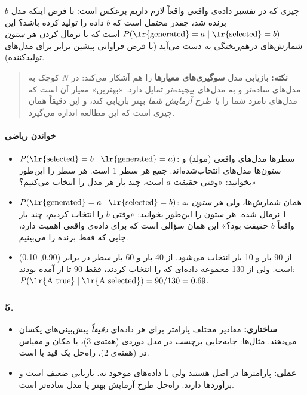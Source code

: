 چیزی که در تفسیر داده‌ی واقعی واقعاً لازم داریم برعکس است: با فرض اینکه
مدل \(b\) برنده شد، چقدر محتمل است که \(b\) داده را تولید کرده باشد؟ این
\textbf{}
\(P(\text{\lr{generated}} = a \mid \text{\lr{selected}} = b)\) است که با نرمال
کردن هر \emph{ستون} شمارش‌های درهم‌ریختگی به دست می‌آید (با فرض فراوانی
پیشین برابر برای مدل‌های تولیدکننده).

\begin{quote}
\textbf{نکته:} بازیابی مدل \textbf{سوگیری‌های معیارها} را هم آشکار می‌کند:
 در \(N\) کوچک به مدل‌های ساده‌تر و  به مدل‌های پیچیده‌تر
تمایل دارد. «بهترین» معیار آن است که مدل‌های نامزد شما را \emph{با طرح
آزمایش شما} بهتر بازیابی کند، و این دقیقاً همان چیزی است که این مطالعه
اندازه می‌گیرد.
\end{quote}

\paragraph{خواندن ریاضی}

\begin{itemize}
\tightlist
\item
  \textbf{}
  \(P(\text{\lr{selected}} = b \mid \text{\lr{generated}} = a)\): سطرها مدل‌های
  واقعی (مولد) و ستون‌ها مدل‌های انتخاب‌شده‌اند. جمع هر سطر 1 است. هر سطر را
  این‌طور بخوانید: «وقتی حقیقت \(a\) است، چند بار هر مدل را انتخاب
  می‌کنیم؟»
\item
  \textbf{}
  \(P(\text{\lr{generated}} = a \mid \text{\lr{selected}} = b)\): همان شمارش‌ها،
  ولی هر \emph{ستون} به 1 نرمال شده. هر ستون را این‌طور بخوانید: «وقتی
  \(b\) را انتخاب کردیم، چند بار واقعاً \(b\) حقیقت بود؟» این همان سؤالی
  است که برای داده‌ی واقعی اهمیت دارد، جایی که فقط برنده را می‌بینیم.
\item
  از  90 بار  و 10 بار  انتخاب می‌شود. از  40
  بار  و 60 بار  سطر  در  برابر
  (0.90, 0.10) است. ولی از 130 مجموعه داده‌ای که  را انتخاب کردند،
  فقط 90 تا از  آمده بودند:
  \(P(\text{\lr{A true}} \mid \text{\lr{A selected}}) = 90/130 = 0.69\).
\end{itemize}

\subsubsection{\texorpdfstring{5.
}{5. identifiability}}

\begin{itemize}
\tightlist
\item
  \textbf{ ساختاری:} مقادیر مختلف پارامتر برای هر
  داده‌ای \emph{دقیقاً} پیش‌بینی‌های یکسان می‌دهند. مثال‌ها: جابه‌جایی برچسب در
  مدل دوردی (هفته‌ی 3)، یا مکان و مقیاس در  (هفته‌ی 2). راه‌حل یک
  قید یا  است.
\item
  \textbf{ عملی:} پارامترها در اصل
   هستند ولی با داده‌های موجود نه. بازیابی ضعیف است و
  برآوردها  دارند. راه‌حل طرح آزمایش بهتر یا مدل ساده‌تر
  است.
\end{itemize}

